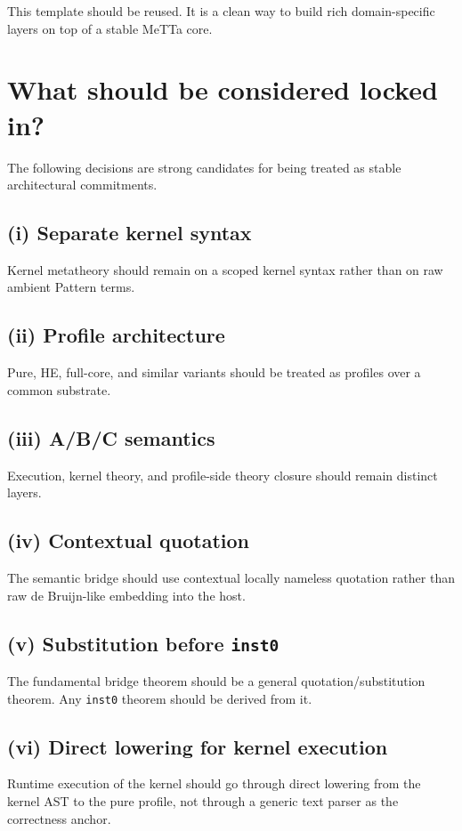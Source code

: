 \documentclass[11pt]{article}
\begin{document}
This template should be reused. It is a clean way to build rich domain-specific layers on top of a stable MeTTa core.

\section{What should be considered locked in?}

The following decisions are strong candidates for being treated as stable architectural commitments.

\subsection*{(i) Separate kernel syntax}
Kernel metatheory should remain on a scoped kernel syntax rather than on raw ambient Pattern terms.

\subsection*{(ii) Profile architecture}
Pure, HE, full-core, and similar variants should be treated as profiles over a common substrate.

\subsection*{(iii) A/B/C semantics}
Execution, kernel theory, and profile-side theory closure should remain distinct layers.

\subsection*{(iv) Contextual quotation}
The semantic bridge should use contextual locally nameless quotation rather than raw de Bruijn-like embedding into the host.

\subsection*{(v) Substitution before \texttt{inst0}}
The fundamental bridge theorem should be a general quotation/substitution theorem. Any \texttt{inst0} theorem should be derived from it.

\subsection*{(vi) Direct lowering for kernel execution}
Runtime execution of the kernel should go through direct lowering from the kernel AST to the pure profile, not through a generic text parser as the correctness anchor.
\end{document}
